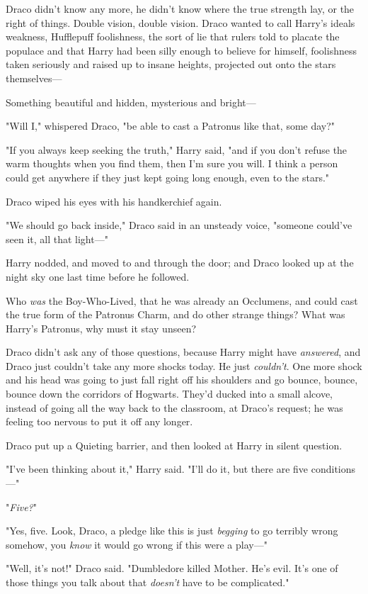 Draco didn’t know any more, he didn’t know where the true strength lay, or the
right of things. Double vision, double vision. Draco wanted to call Harry’s
ideals weakness, Hufflepuff foolishness, the sort of lie that rulers told to
placate the populace and that Harry had been silly enough to believe for
himself, foolishness taken seriously and raised up to insane heights, projected
out onto the stars themselves—

Something beautiful and hidden, mysterious and bright—

"Will I," whispered Draco, "be able to cast a Patronus like that, some day?"

"If you always keep seeking the truth," Harry said, "and if you don’t refuse
the warm thoughts when you find them, then I’m sure you will. I think a person
could get anywhere if they just kept going long enough, even to the stars."

Draco wiped his eyes with his handkerchief again.

"We should go back inside," Draco said in an unsteady voice, "someone could’ve
seen it, all that light—"

Harry nodded, and moved to and through the door; and Draco looked up at the
night sky one last time before he followed.

Who \emph{was} the Boy-Who-Lived, that he was already an Occlumens, and could
cast the true form of the Patronus Charm, and do other strange things? What was
Harry’s Patronus, why must it stay unseen?

Draco didn’t ask any of those questions, because Harry might have
\emph{answered}, and Draco just couldn’t take any more shocks today. He just
\emph{couldn’t}. One more shock and his head was going to just fall right off
his shoulders and go bounce, bounce, bounce down the corridors of Hogwarts.
\later
They’d ducked into a small alcove, instead of going all the way back to the
classroom, at Draco’s request; he was feeling too nervous to put it off any
longer.

Draco put up a Quieting barrier, and then looked at Harry in silent question.

"I’ve been thinking about it," Harry said. "I’ll do it, but there are five
conditions—"

"\emph{Five?}"

"Yes, five. Look, Draco, a pledge like this is just \emph{begging} to go
terribly wrong somehow, you \emph{know} it would go wrong if this were a
play—"

"Well, it’s not!" Draco said. "Dumbledore killed Mother. He’s evil. It’s one of
those things you talk about that \emph{doesn’t} have to be complicated."

